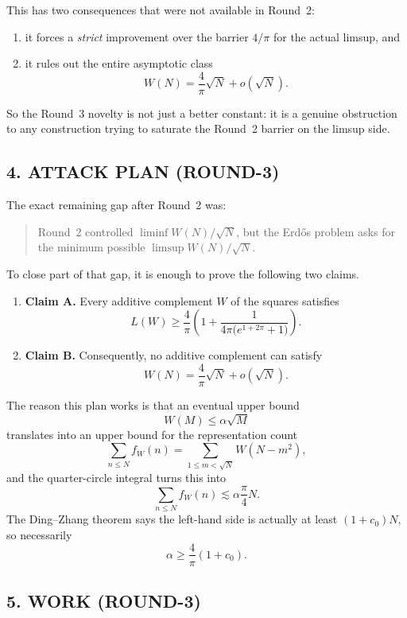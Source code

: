 This has two consequences that were not available in Round~2:
\begin{enumerate}
\item it forces a \emph{strict} improvement over the barrier \(4/\pi\) for the actual limsup, and
\item it rules out the entire asymptotic class
\[
W(N)=\frac{4}{\pi}\sqrt N+o(\sqrt N).
\]
\end{enumerate}

So the Round~3 novelty is not just a better constant: it is a genuine obstruction to any construction trying to saturate the Round~2 barrier on the limsup side.

\subsection*{4. ATTACK PLAN (ROUND-3)}

The exact remaining gap after Round~2 was:
\begin{quote}
Round~2 controlled \(\liminf W(N)/\sqrt N\), but the Erd\H{o}s problem asks for the minimum possible \(\limsup W(N)/\sqrt N\).
\end{quote}

To close part of that gap, it is enough to prove the following two claims.

\begin{enumerate}
\item \textbf{Claim A.} Every additive complement \(W\) of the squares satisfies
\[
L(W)\ge \frac{4}{\pi}\left(1+\frac{1}{4\pi\bigl(e^{1+2\pi}+1\bigr)}\right).
\]

\item \textbf{Claim B.} Consequently, no additive complement can satisfy
\[
W(N)=\frac{4}{\pi}\sqrt N+o(\sqrt N).
\]
\end{enumerate}

The reason this plan works is that an eventual upper bound
\[
W(M)\le \alpha\sqrt M
\]
translates into an upper bound for the representation count
\[
\sum_{n\le N} f_W(n)=\sum_{1\le m<\sqrt N} W(N-m^2),
\]
and the quarter-circle integral turns this into
\[
\sum_{n\le N} f_W(n)\lesssim \alpha\frac{\pi}{4}N.
\]
The Ding--Zhang theorem says the left-hand side is actually at least \((1+c_0)N\), so necessarily
\[
\alpha\ge \frac{4}{\pi}(1+c_0).
\]

\subsection*{5. WORK (ROUND-3)}

